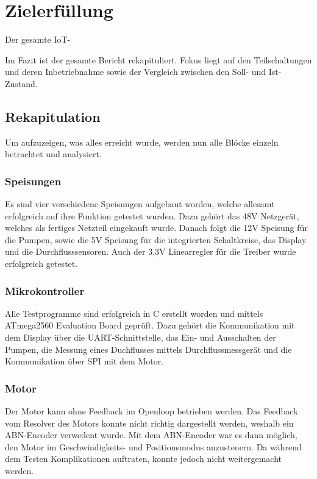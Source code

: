 \clearpage
\section{Zielerfüllung}
\label{sec:Zielerfüllung}

Der gesamte IoT-

Im Fazit ist der gesamte Bericht rekapituliert. Fokus liegt auf den Teilschaltungen und deren Inbetriebnahme sowie der Vergleich zwischen den Soll- und Ist-Zustand.

\subsection{Rekapitulation}
\label{subsec:Was_wurde_erreicht_und_was_nicht}

Um aufzuzeigen, was alles erreicht wurde, werden nun alle Blöcke einzeln betrachtet und analysiert.

\subsubsection{Speisungen}
\label{subsubsec:Fazit_Speisungen}

Es sind vier verschiedene Speisungen aufgebaut worden, welche allesamt erfolgreich auf ihre Funktion getestet wurden. Dazu gehört das 48V Netzgerät, welches als fertiges Netzteil eingekauft wurde. Danach folgt die 12V Speisung für die Pumpen, sowie die 5V Speisung für die integrierten Schaltkreise, das Display und die Durchflusssensoren. Auch der 3,3V Linearregler für die Treiber wurde erfolgreich getestet. 

\subsubsection{Mikrokontroller}
\label{subsubsec:Fazit_Mikrokontroller}

Alle Testprogramme sind erfolgreich in C erstellt worden und mittels ATmega2560 Evaluation Board geprüft. Dazu gehört die Kommunikation mit dem Display über die UART-Schnittstelle, das Ein- und Ausschalten der Pumpen, die Messung eines Duchflusses mittels Durchflussmessgerät und die Kommunikation über SPI mit dem Motor.

\subsubsection{Motor}
\label{subsubsec:Fazit_Motor}

Der Motor kann ohne Feedback im Openloop betrieben werden. Das Feedback vom Resolver des Motors konnte nicht richtig dargestellt werden, weshalb ein ABN-Encoder verwedent wurde. Mit dem ABN-Encoder war es dann möglich, den Motor im Geschwindigkeits- und Positionsmodus anzusteuern. Da während dem Testen Komplikationen auftraten, konnte jedoch nicht weitergemacht werden.

